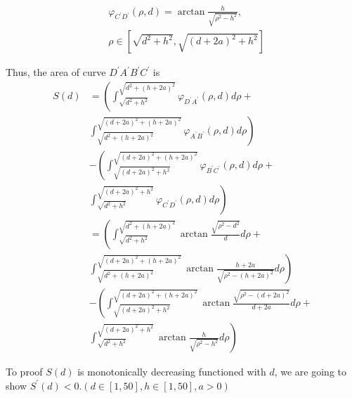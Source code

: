 \documentclass[letterpaper]{article} \usepackage{aaai23}  \usepackage{times}  \usepackage{helvet}  \usepackage{courier}  \usepackage[hyphens]{url}  \usepackage{graphicx} \urlstyle{rm} \def\UrlFont{\rm}  \usepackage{natbib}  \usepackage{caption} \frenchspacing  \setlength{\pdfpagewidth}{8.5in} \setlength{\pdfpageheight}{11in} \usepackage{algorithm}
\begin{document}
\begin{equation}
\begin{split}
    &\varphi_{C^{\prime}D^{\prime}}(\rho,d)=\arctan\frac{h}{\sqrt{\rho^2-h^2}},\\
    &\rho\in[\sqrt{d^2+h^2},\sqrt{(d+2a)^2+h^2}]
\end{split}
\end{equation}

Thus, the area of curve $D^{\prime}A^{\prime}B^{\prime}C^{\prime}$ is
\begin{align*}\tag{5}
S(d)&=\left(\int_{\sqrt{d^2+h^2}}^{\sqrt{d^2+(h+2a)^2}} \varphi_{D^{\prime}A^{\prime}}(\rho,d) d\rho +  \right.\\ &\left. \int_{\sqrt{d^2+(h+2a)^2}}^{\sqrt{(d+2a)^2+(h+2a)^2}} \varphi_{A^{\prime}B^{\prime}}(\rho,d) d\rho\right)\\
&-\left(\int_{\sqrt{(d+2a)^2+h^2}}^{\sqrt{(d+2a)^2+(h+2a)^2}} \varphi_{B^{\prime}C^{\prime}}(\rho,d) d\rho+ \right.\\ &\left.
\int_{\sqrt{d^2+h^2}}^{\sqrt{(d+2a)^2+h^2}} \varphi_{C^{\prime}D^{\prime}}(\rho,d) d\rho\right) \\
&=\left(\int_{\sqrt{d^2+h^2}}^{\sqrt{d^2+(h+2a)^2}} \arctan\frac{\sqrt{\rho^2-d^2}}{d} d\rho + 
\right.\\ &\left.\int_{\sqrt{d^2+(h+2a)^2}}^{\sqrt{(d+2a)^2+(h+2a)^2}} \arctan\frac{h+2a}{\sqrt{\rho^2-(h+2a)^2}} d\rho\right)\\
& -\left(\int_{\sqrt{(d+2a)^2+h^2}}^{\sqrt{(d+2a)^2+(h+2a)^2}} \arctan\frac{\sqrt{\rho^2-(d+2a)^2}}{d+2a} d\rho+\right.\\ &\left.
\int_{\sqrt{d^2+h^2}}^{\sqrt{(d+2a)^2+h^2}} \arctan\frac{h}{\sqrt{\rho^2-h^2}} d\rho\right)
\end{align*}

To proof $S(d)$ is monotonically decreasing functioned with $d$, we are going to show $S^{\prime}(d)<0. (d\in [1,50], h\in [1, 50], a > 0)$
\end{document}
